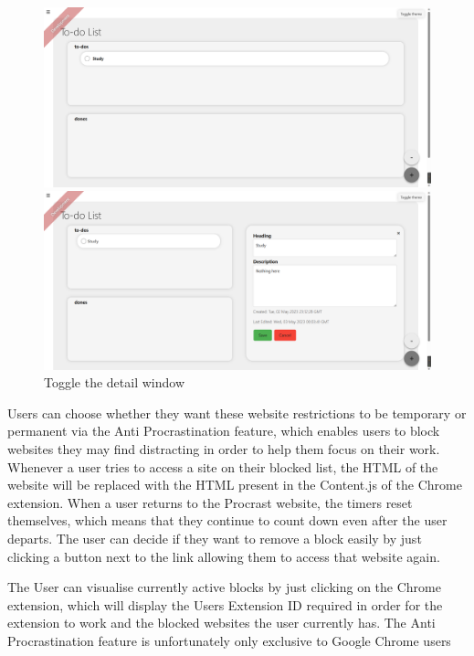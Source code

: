 \documentclass[a4paper]{article}
\begin{document}
\begin{figure}[H]
    \centering
    \begin{minipage}{0.49\textwidth}
      \centering
      \includegraphics[width=\linewidth]{./image/todolist_1.png}
    \end{minipage}\hfill
    \begin{minipage}{0.49\textwidth}
      \centering
      \includegraphics[width=\linewidth]{./image/todolist_2.png}
    \end{minipage}
    \caption*{Toggle the detail window}
\end{figure}

Users can choose whether they want these website restrictions to be temporary or permanent via the Anti Procrastination feature, which enables users to block websites they may find distracting in order to help them focus on their work.
Whenever a user tries to access a site on their blocked list, the HTML of the
website will be replaced with the HTML present in the Content.js of the Chrome extension.
When a user returns to the Procrast website, the timers reset themselves, which means that they continue to count down even after the user departs.
The user can decide if they want to remove a block easily by just clicking a button next to the link allowing them to access that website again.

The User can visualise currently active blocks by just clicking on the Chrome extension,  which will display the Users Extension ID required in order for the extension to work and the blocked websites the user currently has.
The Anti Procrastination feature is unfortunately only exclusive to Google Chrome users
\end{document}
